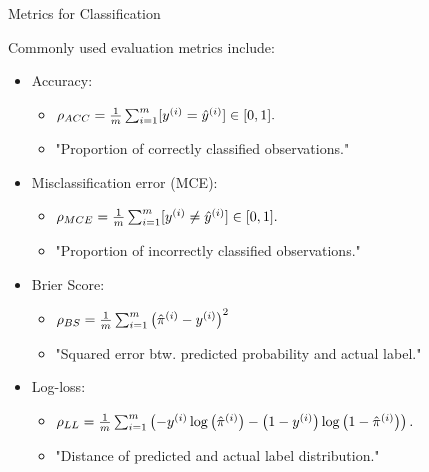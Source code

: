 \documentclass[11pt,compress,t,notes=noshow, xcolor=table]{beamer}
\begin{document}



\begin{vbframe}{Metrics for Classification}

Commonly used evaluation metrics include:
\begin{itemize}
\item Accuracy: \\
\begin{itemize}
\item $ \rho_{ACC} = \frac{1}{m} \sum_{i = 1}^m [y^{(i)} = \hat{y}^{(i)}] \in [0, 1]. $
\item "Proportion of correctly classified observations."
\end{itemize}
\item Misclassification error (MCE): \\
\begin{itemize}
\item $ \rho_{MCE} = \frac{1}{m} \sum_{i = 1}^m [y^{(i)} \neq \hat{y}^{(i)}] \in [0, 1]. $
\item "Proportion of incorrectly classified observations."
\end{itemize}
\item Brier Score: \\
\begin{itemize}
\item $\rho_{BS} = \frac{1}{m} \sum_{i = 1}^m 
\left( \hat \pi^{(i)} - y^{(i)} \right)^2$
\item "Squared error btw. predicted probability and actual label."
\end{itemize}
\item Log-loss: \\
\begin{itemize}
\item $\rho_{LL} = \frac{1}{m} \sum_{i = 1}^m \left( - y^{(i)} \log \left( 
\hat \pi^{(i)} \right) - \left( 1-y^{(i)} \right) \log \left( 1 - \hat \pi^{(i)} 
\right) \right).$
\item "Distance of predicted and actual label distribution."
\end{itemize}
\end{itemize}


\end{vbframe}
\end{document}
